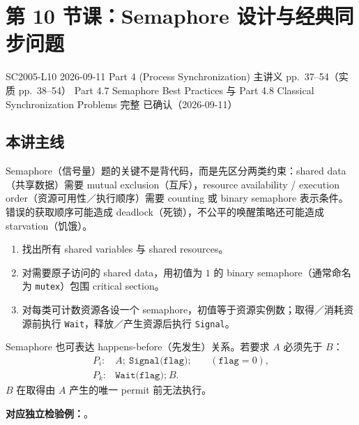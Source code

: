 
\section{第 10 节课：Semaphore 设计与经典同步问题}
\label{lecture:SC2005-L10}

\lecturemeta
  {SC2005-L10}
  {2026-09-11}
  {Part 4 (Process Synchronization)}
  {主讲义 pp.~37--54（实质 pp.~38--54）}
  {Part 4.7 Semaphore Best Practices 与 Part 4.8 Classical Synchronization Problems 完整}
  {已确认（2026-09-11）}

\subsection{本讲主线}

Semaphore（信号量）题的关键不是背代码，而是先区分两类约束：shared data（共享数据）需要 mutual exclusion（互斥），resource availability / execution order（资源可用性／执行顺序）需要 counting 或 binary semaphore 表示条件。错误的获取顺序可能造成 deadlock（死锁），不公平的唤醒策略还可能造成 starvation（饥饿）。


\begin{enumerate}
  \item 找出所有 shared variables 与 shared resources。
  \item 对需要原子访问的 shared data，用初值为 $1$ 的 binary semaphore（通常命名为 \texttt{mutex}）包围 critical section。
  \item 对每类可计数资源各设一个 semaphore，初值等于资源实例数；取得／消耗资源前执行 \texttt{Wait}，释放／产生资源后执行 \texttt{Signal}。
\end{enumerate}

Semaphore 也可表达 happens-before（先发生）关系。若要求 $A$ 必须先于 $B$：
\[
\begin{array}{ll}
P_i: & A;\ \texttt{Signal(flag);}\qquad (\texttt{flag}=0),\\
P_k: & \texttt{Wait(flag);}\ B.
\end{array}
\]
$B$ 在取得由 $A$ 产生的唯一 permit 前无法执行。

\textbf{对应独立检验例：}。


